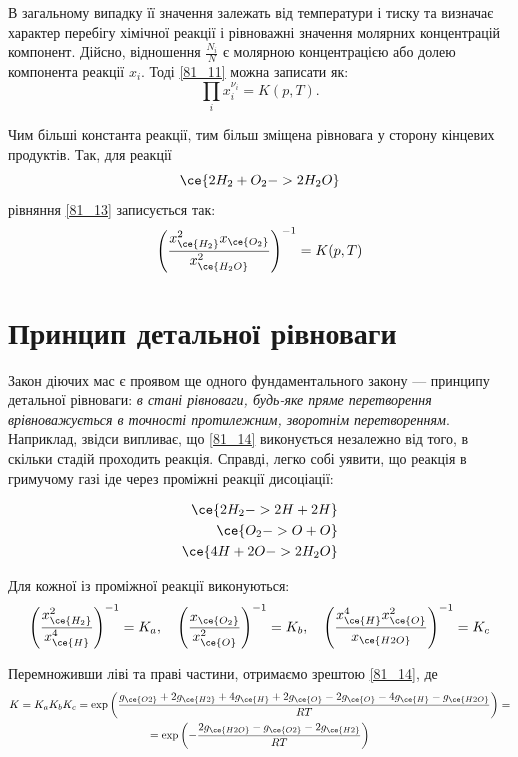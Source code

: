 В загальному випадку її значення залежать від температури і тиску та визначає характер перебігу хімічної реакції і рівноважні значення молярних концентрацій компонент. Дійсно, відношення $\frac{N_i}{N}$ є молярною концентрацією або долею компонента реакції $x_i$. Тоді \eqref{81_11} можна записати як:
\begin{equation} \label{81_13}
\prod_i x_i^{\nu_i} = K(p,T).
\end{equation}

Чим більші константа реакції, тим більш зміщена рівновага у сторону кінцевих продуктів. Так, для реакції
\[
\ce{2H_2 + O_2 -> 2H_2O}
\]
рівняння \eqref{81_13} записується так:
\begin{equation} \label{81_14}
\left(\frac{x^2_{\ce{H_2}} x_{\ce{O_2}}}{x^2_{\ce{H_2O}}}\right)^{-1} = K(p,T)
\end{equation}

\section{Принцип детальної рівноваги}

Закон діючих мас є проявом ще одного фундаментального закону --- принципу детальної рівноваги: \emph{в стані рівноваги, будь-яке пряме перетворення врівноважується в точності протилежним, зворотнім перетворенням}. Наприклад, звідси випливає, що \eqref{81_14} виконується незалежно від того, в скільки стадій проходить реакція. Справді, легко собі уявити, що реакція в гримучому газі іде через проміжні реакції дисоціації:

\begin{align*}
    \ce{2H_2 -> 2H + 2H}\\
    \ce{O_2 -> O + O}\\
    \ce{4H + 2O -> 2H_2O}
\end{align*}


Для кожної із проміжної реакції виконуються:
\begin{equation} \label{82_2}
\left(\frac{x^2_{\ce{H_2}}}{x^4_{\ce{H}}}\right)^{-1} = K_a, \quad \left(\frac{x_{\ce{O_2}}}{x^2_{\ce{O}}}\right)^{-1}
= K_b, \quad \left(\frac{x^4_{\ce{H}} x^2_{\ce{O}} }{x_{\ce{H2O}}}\right)^{-1} = K_c
\end{equation}

Перемноживши ліві та праві частини, отримаємо зрештою \eqref{81_14}, де
\begin{multline} \label{82_3}
K = K_a K_b K_c  = \exp \left(
%
\frac{
g_{\ce{O2}} + 2 g_{\ce{H2}} + 4 g_{\ce{H}} + 2 g_{\ce{O}} - 2 g_{\ce{O}} - 4 g_{\ce{H}} - g_{\ce{H2O}}
}%
{R T}
%
\right) = \\
=
\exp \left(
-\frac{2 g_{\ce{H2O}} - g_{\ce{O2}} - 2 g_{\ce{H2}}}{R T}
\right)
\end{multline}

